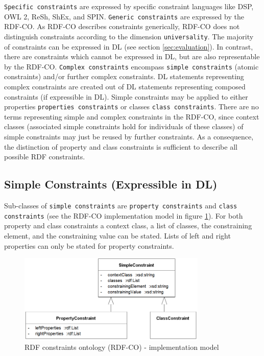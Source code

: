 \documentclass{llncs}
\newcommand{\ms}[1]{\texttt{#1}}
\begin{document}
\ms{Specific constraints} are expressed by specific constraint languages like DSP, OWL 2, ReSh, ShEx, and SPIN.
\ms{Generic constraints} are expressed by the RDF-CO.
As RDF-CO describes constraints generically, RDF-CO does not distinguish constraints according to the dimension \ms{universality}. 
The majority of constraints can be expressed in DL (see section \ref{sec:evaluation}).
In contrast, there are constraints which cannot be expressed in DL, but are also representable by the RDF-CO. 
\ms{Complex constraints} encompass \ms{simple constraints} (atomic constraints) and/or further complex constraints.
DL statements representing complex constraints are created out of DL statements representing composed constraints (if expressible in DL). 
Simple constraints may be applied to either properties \ms{properties constraints} or classes \ms{class constraints}.
There are no terms representing simple and complex constraints in the RDF-CO, since context classes (associated simple constraints hold for individuals of these classes) of simple constraints may just be reused by further constraints.
As a consequence, the distinction of property and class constraints is sufficient to describe all possible RDF constraints.

\subsection{Simple Constraints (Expressible in DL)}

Sub-classes of \ms{simple constraints} are \ms{property constraints} and \ms{class constraints} (see the RDF-CO implementation model in figure \ref{fig:RDF-CO-implementation-model}). 
For both property and class constraints a context class, a list of classes, the constraining element, and the constraining value can be stated. 
Lists of left and right properties can only be stated for property constraints.

\begin{figure}
	\centering
		\includegraphics[width=0.80\textwidth]{images/RDF-CO-implementation-model.png}
	\caption{RDF constraints ontology (RDF-CO) - implementation model}
	\label{fig:RDF-CO-implementation-model}
\end{figure}
\end{document}
